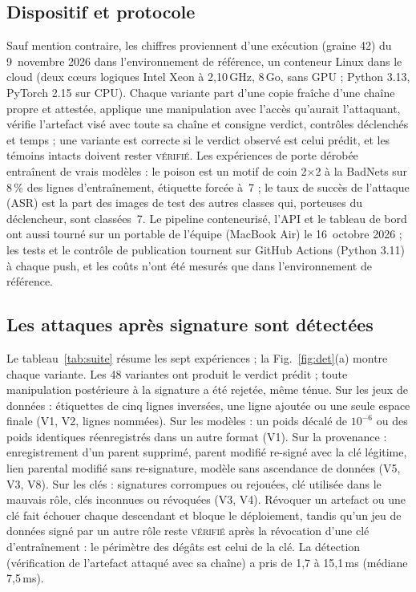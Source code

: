 \documentclass[conference]{IEEEtran}
\newcommand{\st}[1]{\textsc{#1}}
\begin{document}
\subsection{Dispositif et protocole}
Sauf mention contraire, les chiffres proviennent d'une exécution (graine 42) du 9~novembre 2026 dans l'environnement de référence, un conteneur Linux dans le cloud (deux cœurs logiques Intel Xeon à 2,10\,GHz, 8\,Go, sans GPU ; Python 3.13, PyTorch 2.15 sur CPU). Chaque variante part d'une copie fraîche d'une chaîne propre et attestée, applique une manipulation avec l'accès qu'aurait l'attaquant, vérifie l'artefact visé avec toute sa chaîne et consigne verdict, contrôles déclenchés et temps ; une variante est correcte si le verdict observé est celui prédit, et les témoins intacts doivent rester \st{vérifié}. Les expériences de porte dérobée entraînent de vrais modèles : le poison est un motif de coin 2$\times$2 à la BadNets \cite{badnets} sur 8\,\% des lignes d'entraînement, étiquette forcée à~7 ; le taux de succès de l'attaque (ASR) est la part des images de test des autres classes qui, porteuses du déclencheur, sont classées~7. Le pipeline conteneurisé, l'API et le tableau de bord ont aussi tourné sur un portable de l'équipe (MacBook Air) le 16~octobre 2026 ; les tests et le contrôle de publication tournent sur GitHub Actions (Python 3.11) à chaque push, et les coûts n'ont été mesurés que dans l'environnement de référence.

\subsection{Les attaques après signature sont détectées}
Le tableau~\ref{tab:suite} résume les sept expériences ; la Fig.~\ref{fig:det}(a) montre chaque variante. Les 48 variantes ont produit le verdict prédit ; toute manipulation postérieure à la signature a été rejetée, même ténue. Sur les jeux de données : étiquettes de cinq lignes inversées, une ligne ajoutée ou une seule espace finale (V1, V2, lignes nommées). Sur les modèles : un poids décalé de $10^{-6}$ ou des poids identiques réenregistrés dans un autre format (V1). Sur la provenance : enregistrement d'un parent supprimé, parent modifié re-signé avec la clé légitime, lien parental modifié sans re-signature, modèle sans ascendance de données (V5, V3, V8). Sur les clés : signatures corrompues ou rejouées, clé utilisée dans le mauvais rôle, clés inconnues ou révoquées (V3, V4). Révoquer un artefact ou une clé fait échouer chaque descendant et bloque le déploiement, tandis qu'un jeu de données signé par un autre rôle reste \st{vérifié} après la révocation d'une clé d'entraînement : le périmètre des dégâts est celui de la clé. La détection (vérification de l'artefact attaqué avec sa chaîne) a pris de 1,7 à 15,1\,ms (médiane 7,5\,ms).
\end{document}
